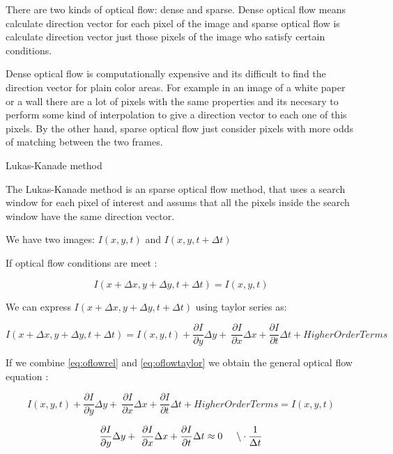 There are two kinds of optical flow: dense and sparse. Dense optical flow means  calculate direction vector for each pixel of the image and sparse optical flow is calculate direction vector just those pixels of the image 
who satisfy certain conditions.

Dense optical flow is computationally expensive and its difficult to find the direction vector 
for plain color areas. For example in an image of a white paper or a wall
there are a lot of pixels with the same properties and its necesary to perform some kind of interpolation to give a direction vector
 to each one of this pixels. 
By the other hand, sparse optical flow just consider pixels with more odds of matching between the two frames.

Lukas-Kanade method

The Lukas-Kanade method is an sparse optical flow method, that 
uses a search window for each pixel of interest and assums that all the pixels 
inside the search window have the same direction vector.


We have two images: $I(x,y,t)$ and $I(x,y,t+\Delta t)$ 

If optical flow conditions are meet :

\begin{equation}
\label{eq:oflowrel}
I(x + \Delta x,y + \Delta y, t + \Delta t) = I(x,y,t)
\end{equation}

We can express $I(x + \Delta x, y + \Delta y, t + \Delta t)$ using taylor series as:

\begin{equation}
\label{eq:oflowtaylor}
I(x + \Delta x, y + \Delta y, t + \Delta t) = I(x,y,t) + \frac{\partial I}{\partial y} \Delta y + \
 \frac{\partial I}{\partial x} \Delta x  + \frac{\partial I}{\partial t} \Delta t + Higher Order Terms 
\end{equation}

If we combine \ref{eq:oflowrel} and \ref{eq:oflowtaylor} we obtain the general optical flow equation :


$$ I(x,y,t) + \frac{\partial I}{\partial y} \Delta y + \
 \frac{\partial I}{\partial x} \Delta x  + \frac{\partial I}{\partial t} \Delta t + Higher Order Terms = I(x,y,t) $$


$$ \frac{\partial I}{\partial y} \Delta y + \
 \frac{\partial I}{\partial x} \Delta x  + \frac{\partial I}{\partial t} \Delta t \approx 0 \hspace{0.5cm} \backslash \cdot \frac{1}{\Delta t} $$


